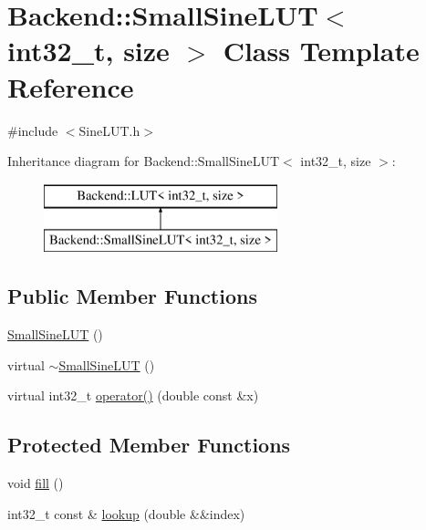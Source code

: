 \hypertarget{class_backend_1_1_small_sine_l_u_t_3_01int32__t_00_01size_01_4}{\section{Backend\+:\+:Small\+Sine\+L\+U\+T$<$ int32\+\_\+t, size $>$ Class Template Reference}
\label{class_backend_1_1_small_sine_l_u_t_3_01int32__t_00_01size_01_4}
}


{\ttfamily \#include $<$Sine\+L\+U\+T.\+h$>$}

Inheritance diagram for Backend\+:\+:Small\+Sine\+L\+U\+T$<$ int32\+\_\+t, size $>$\+:\begin{figure}[H]
\begin{center}
\leavevmode
\includegraphics[height=2.000000cm]{class_backend_1_1_small_sine_l_u_t_3_01int32__t_00_01size_01_4}
\end{center}
\end{figure}
\subsection*{Public Member Functions}
\begin{DoxyCompactItemize}
\item 
\hyperlink{class_backend_1_1_small_sine_l_u_t_3_01int32__t_00_01size_01_4_a05f2fcd7c8a0430dc0137e67d385dc1b}{Small\+Sine\+L\+U\+T} ()
\item 
virtual \hyperlink{class_backend_1_1_small_sine_l_u_t_3_01int32__t_00_01size_01_4_a3db4fc45b900c846711e0cbd828dbbf4}{$\sim$\+Small\+Sine\+L\+U\+T} ()
\item 
virtual int32\+\_\+t \hyperlink{class_backend_1_1_small_sine_l_u_t_3_01int32__t_00_01size_01_4_a7eff39a75385950b722ed2ba7140d4e4}{operator()} (double const \&x)
\end{DoxyCompactItemize}
\subsection*{Protected Member Functions}
\begin{DoxyCompactItemize}
\item 
void \hyperlink{class_backend_1_1_small_sine_l_u_t_3_01int32__t_00_01size_01_4_a0fad3b2c0904d1c2a65c850431f1ac3f}{fill} ()
\item 
int32\+\_\+t const \& \hyperlink{class_backend_1_1_small_sine_l_u_t_3_01int32__t_00_01size_01_4_ab58e1db04772d8fad7b5d0f4936454bd}{lookup} (double \&\&index)
\end{DoxyCompactItemize}
